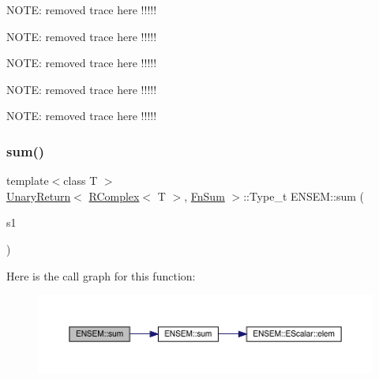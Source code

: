 N\+O\+TE\+: removed trace here !!!!!

N\+O\+TE\+: removed trace here !!!!!

N\+O\+TE\+: removed trace here !!!!!

N\+O\+TE\+: removed trace here !!!!!

N\+O\+TE\+: removed trace here !!!!! \mbox{\label{group__rcomplex_ga402ccaab21c1a8ce0e99c8d2b1ee1c53}} 
\subsubsection{\texorpdfstring{sum()}{sum()}}
{\footnotesize\ttfamily template$<$class T $>$ \\
\mbox{\hyperlink{structENSEM_1_1UnaryReturn}{Unary\+Return}}$<$ \mbox{\hyperlink{classENSEM_1_1RComplex}{R\+Complex}}$<$ T $>$, \mbox{\hyperlink{structENSEM_1_1FnSum}{Fn\+Sum}} $>$\+::Type\+\_\+t E\+N\+S\+E\+M\+::sum (\begin{DoxyParamCaption}\item[{const \mbox{\hyperlink{classENSEM_1_1RComplex}{R\+Complex}}$<$ T $>$ \&}]{s1 }\end{DoxyParamCaption})\hspace{0.3cm}{\ttfamily [inline]}}

Here is the call graph for this function\+:\nopagebreak
\begin{figure}[H]
\begin{center}
\leavevmode
\includegraphics[width=350pt]{da/dc7/group__rcomplex_ga402ccaab21c1a8ce0e99c8d2b1ee1c53_cgraph}
\end{center}
\end{figure}
\mbox{\label{group__rcomplex_ga1741ab434937b21a3f54881161f429aa}} 
